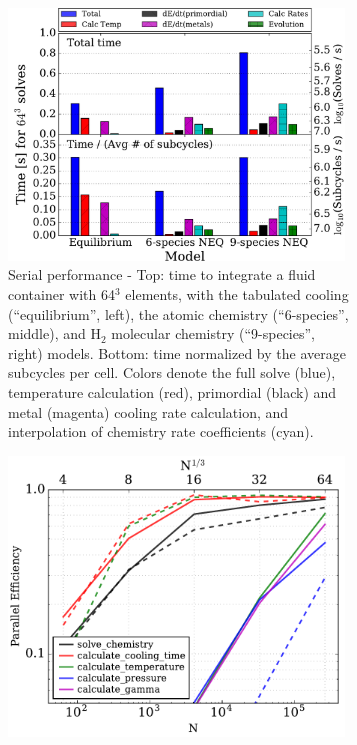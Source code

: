 \documentclass[11pt]{article}
\begin{document}
\begin{flushleft}
\begin{figure}[h]
\centering
\begin{subfigure}{.54\textwidth}
  \centering
  \includegraphics[width=0.98\textwidth]{figures/performance.pdf}
  \caption{Serial performance - Top: time
    to integrate a fluid container with 64$^{3}$ elements, with the
    tabulated cooling (``equilibrium'', left), the atomic chemistry
    (``6-species'', middle), and H$_{2}$ molecular chemistry
    (``9-species'', right) models.  Bottom: time normalized by the
    average subcycles per cell.  Colors denote the full solve
    (blue), temperature calculation (red), primordial (black) and metal
    (magenta) cooling rate calculation, and interpolation of chemistry
    rate coefficients (cyan).}
  \label{fig:single-proc}
\end{subfigure}%
\hspace{0.02\textwidth}
\begin{subfigure}{.42\textwidth}
  \centering
  \includegraphics[width=0.98\textwidth]{figures/openmp.pdf}

\end{subfigure}
\end{figure}
\end{flushleft}
\end{document}
